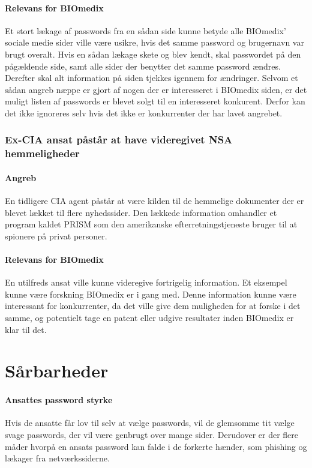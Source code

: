 \documentclass{article}
\begin{document}
\paragraph{Relevans for BIOmedix}

Et stort lækage af passwords fra en sådan side kunne betyde alle BIOmedix'
sociale medie sider ville være usikre, hvis det samme password og brugernavn var 
brugt overalt.
Hvis en sådan lækage skete og blev kendt, skal passwordet på den pågældende side, samt
alle sider der benytter det samme password ændres. Derefter skal alt information på
siden tjekkes igennem for ændringer.
Selvom et sådan angreb næppe er gjort af nogen der er interesseret i BIOmedix siden, er
det muligt listen af passwords er blevet solgt til en interesseret konkurent. Derfor kan
det ikke ignoreres selv hvis det ikke er konkurrenter der har lavet angrebet.

\subsubsection{Ex-CIA ansat påstår at have videregivet NSA hemmeligheder} 

\paragraph{Angreb}
En tidligere CIA agent påstår at være kilden til de hemmelige dokumenter der er blevet
lækket til flere nyhedssider. Den lækkede information omhandler et program kaldet PRISM som
den amerikanske efterretningstjeneste bruger til at spionere på privat personer\cite{CIAStory}.

\paragraph{Relevans for BIOmedix}
En utilfreds ansat ville kunne videregive fortrigelig information. Et eksempel kunne være
forskning BIOmedix er i gang med. Denne information kunne være interessant for konkurrenter, da det ville
give dem muligheden for at forske i det samme, og potentielt tage en patent eller udgive resultater
inden BIOmedix er klar til det.

\section{Sårbarheder}

\paragraph{Ansattes password styrke}
Hvis de ansatte får lov til selv at vælge passwords, vil de glemsomme 
tit vælge svage passwords, der vil være genbrugt over mange sider.
Derudover er der flere måder hvorpå en ansats password kan falde i de
forkerte hænder, som phishing og lækager fra netværkssiderne.
\end{document}
